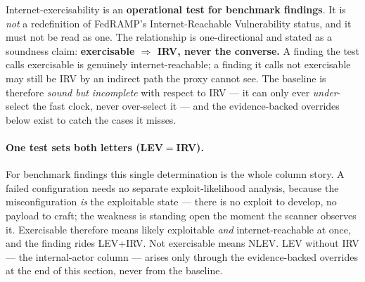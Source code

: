 \documentclass[11pt]{article}
\begin{document}
\begin{definitionbox}
Internet-exercisability is an \textbf{operational test for benchmark findings}. It is
\emph{not} a redefinition of FedRAMP's Internet-Reachable Vulnerability status, and it
must not be read as one. The relationship is one-directional and stated as a soundness
claim: \textbf{exercisable ${}\Longrightarrow{}$ IRV, never the converse.} A finding
the test calls exercisable is genuinely internet-reachable; a finding it calls not
exercisable may still be IRV by an indirect path the proxy cannot see. The baseline is
therefore \emph{sound but incomplete} with respect to IRV --- it can only ever
\emph{under}-select the fast clock, never over-select it --- and the evidence-backed
overrides below exist to catch the cases it misses.
\end{definitionbox}

\paragraph{One test sets both letters (LEV${}={}$IRV).} For benchmark findings this
single determination is the whole column story. A failed configuration needs no
separate exploit-likelihood analysis, because the misconfiguration \emph{is} the
exploitable state --- there is no exploit to develop, no payload to craft; the
weakness is standing open the moment the scanner observes it. Exercisable therefore
means likely exploitable \emph{and} internet-reachable at once, and the finding rides
LEV+IRV. Not exercisable means NLEV. LEV without IRV --- the internal-actor column
--- arises only through the evidence-backed overrides at the end of this section,
never from the baseline.
\end{document}
